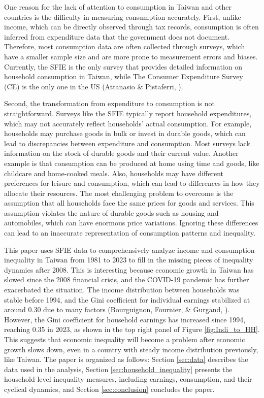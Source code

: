 \documentclass{article}
\begin{document}
One reason for the lack of attention to consumption in Taiwan and other countries is the difficulty in measuring consumption accurately.
First, unlike income, which can be directly observed through tax records, consumption is often inferred from expenditure data that the government does not document.
Therefore, most consumption data are often collected through surveys, which have a smaller sample size and are more prone to measurement errors and biases.
Currently, the SFIE is the only survey that provides detailed information on household consumption in Taiwan, while The Consumer Expenditure Survey (CE) is the only one in the US (Attanasio \& Pistaferri, \citeyear{JEP_Consumption_Inequality}).

Second, the transformation from expenditure to consumption is not straightforward. Surveys like the SFIE typically report household expenditures, which may not accurately reflect households' actual consumption.
For example, households may purchase goods in bulk or invest in durable goods, which can lead to discrepancies between expenditure and consumption. Most surveys lack information on the stock of durable goods and their current value.
Another example is that consumption can be produced at home using time and goods, like childcare and home-cooked meals. Also, households may have different preferences for leisure and consumption, which can lead to differences in how they allocate their resources.
The most challenging problem to overcome is the assumption that all households face the same prices for goods and services. This assumption violates the nature of durable goods such as housing and automobiles, which can have enormous price variations. Ignoring these differences can lead to an inaccurate representation of consumption patterns and inequality.

This paper uses SFIE data to comprehensively analyze income and consumption inequality in Taiwan from 1981 to 2023 to fill in the missing pieces of inequality dynamics after 2008. This is interesting because economic growth in Taiwan has slowed since the 2008 financial crisis, and the COVID-19 pandemic has further exacerbated the situation.
The income distribution between households was stable before 1994, and the Gini coefficient for individual earnings stabilized at around 0.30 due to many factors (Bourguignon, Fournier, \& Gurgand, \citeyear{TW_stable_dist}).
However, the Gini coefficient for household earnings has increased since 1994, reaching 0.35 in 2023, as shown in the top right panel of Figure \ref{fig:Indi_to_HH}.
This suggests that economic inequality will become a problem after economic growth slows down, even in a country with steady income distribution previously, like Taiwan.
The paper is organized as follows: Section \ref{sec:data} describes the data used in the analysis, Section \ref{sec:household_inequality} presents the household-level inequality measures, including earnings, consumption, and their cyclical dynamics, and Section \ref{sec:conclusion} concludes the paper.
\end{document}
